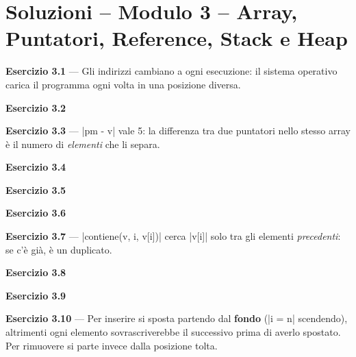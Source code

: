 \chapter{Soluzioni -- Modulo 3 -- Array, Puntatori, Reference, Stack e Heap}
\textbf{Esercizio 3.1} --- Gli indirizzi cambiano a ogni esecuzione: il sistema
operativo carica il programma ogni volta in una posizione diversa.

\textbf{Esercizio 3.2}

\textbf{Esercizio 3.3} --- \cc|pm - v| vale 5: la differenza tra due puntatori
nello stesso array è il numero di \emph{elementi} che li separa.

\textbf{Esercizio 3.4}

\textbf{Esercizio 3.5}

\textbf{Esercizio 3.6}

\textbf{Esercizio 3.7} --- \cc|contiene(v, i, v[i])| cerca \cc|v[i]| solo tra gli
elementi \emph{precedenti}: se c'è già, è un duplicato.

\textbf{Esercizio 3.8}

\textbf{Esercizio 3.9}

\textbf{Esercizio 3.10} --- Per inserire si sposta partendo dal \textbf{fondo}
(\cc|i = n| scendendo), altrimenti ogni elemento sovrascriverebbe il successivo
prima di averlo spostato. Per rimuovere si parte invece dalla posizione tolta.

